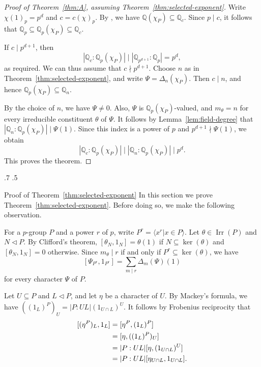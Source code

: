 \documentclass[reqno]{amsart}
\makeatletter
\theoremstyle{definition}
\theoremstyle{remark}
\numberwithin{equation}{section}
\DeclareMathOperator{\Irr}{Irr}
\theoremstyle{plain}
\renewcommand{\section}{%
  \@startsection{section}{1}{\z@}%
    {.7\linespacing\@plus\linespacing}%
    {.5\linespacing}%
    {\normalfont\bfseries\raggedright
     \let\@secnumfont\bfseries}%
}
\makeatother
\begin{document}
\begin{proof}[Proof of Theorem~\ref{thm:A},
  assuming Theorem~\ref{thm:selected-exponent}]
Write $\chi(1)_p=p^d$ and $c=c(\chi)_p$.
By \cite[Lemma~2.5]{IN}, we have
$\mathbb{Q}(\chi_P)\subseteq\mathbb{Q}_c$.
Since $p\mid c$, it follows that
$\mathbb{Q}_p\subseteq\mathbb{Q}_p(\chi_P)
\subseteq\mathbb{Q}_c$.

If $c\mid p^{d+1}$, then
\[
  |\mathbb{Q}_c:\mathbb{Q}_p(\chi_P)|
  \mid |\mathbb{Q}_{p^{d+1}}:\mathbb{Q}_p|
  =p^d,
\]
as required.
We can thus assume that $c\nmid p^{d+1}$.
Choose $n$ as in Theorem~\ref{thm:selected-exponent}, and write
$\Psi=\Delta_n(\chi_P)$.
Then $c\mid n$, and hence
$\mathbb{Q}_p(\chi_P)\subseteq\mathbb{Q}_n$.

By the choice of $n$, we have $\Psi\neq0$.
Also, $\Psi$ is $\mathbb{Q}_p(\chi_P)$-valued, and
$m_\theta=n$ for every irreducible constituent $\theta$ of $\Psi$.
It follows by Lemma~\ref{lem:field-degree} that
$|\mathbb{Q}_n:\mathbb{Q}_p(\chi_P)|\mid\Psi(1)$.
Since this index is a power of $p$ and
$p^{d+1}\nmid\Psi(1)$, we obtain
\[
  |\mathbb{Q}_c:\mathbb{Q}_p(\chi_P)|
  \mid |\mathbb{Q}_n:\mathbb{Q}_p(\chi_P)|
  \mid p^d.
\]
This proves the theorem.
\end{proof}

\section{Proof of Theorem~\ref{thm:selected-exponent}}
\label{sec:linear-rational}
In this section we prove Theorem~\ref{thm:selected-exponent}.
Before doing so, we make the following observation.

For a $p$-group $P$ and a power $r$ of $p$, write
$P^r=\langle x^r|x\in P\rangle$.
Let $\theta\in\Irr(P)$ and $N\lhd P$.
By Clifford's theorem, $[\theta_N,1_N]=\theta(1)$
if $N\subseteq\ker(\theta)$ and $[\theta_N,1_N]=0$ otherwise.
Since $m_\theta\mid r$ if and only if $P^r\subseteq\ker(\theta)$,
we have
\begin{equation}\label{eq:power-subgroup}
  [\Psi_{P^r},1_{P^r}]=\sum_{m\mid r}\Delta_m(\Psi)(1)
\end{equation}
for every character $\Psi$ of $P$.

Let $U\subseteq P$ and $L\lhd P$, and let $\eta$ be a
character of $U$.
By Mackey's formula, we have
$((1_L)^P)_U=|P:UL|(1_{U\cap L})^U$.
It follows by Frobenius reciprocity that
\begin{equation}\label{eq:mackey-inner-product}
\begin{aligned}
  \relax[(\eta^P)_L,1_L]
  &=[\eta^P,(1_L)^P]\\
  &=[\eta,((1_L)^P)_U]\\
  &=|P:UL|[\eta,(1_{U\cap L})^U]\\
  &=|P:UL|[\eta_{U\cap L},1_{U\cap L}].
\end{aligned}
\end{equation}
\end{document}
